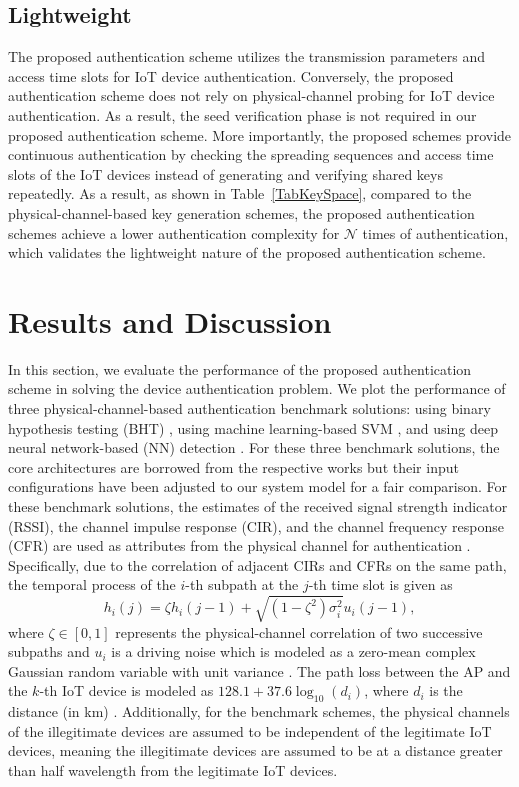 \documentclass[journal,10pt]{IEEEtran}
\begin{document}
\subsection{Lightweight}
The proposed authentication scheme utilizes the transmission parameters and access time slots for IoT device authentication. Conversely, the proposed authentication scheme does not rely on physical-channel probing for IoT device authentication. As a result, the seed verification phase is not required in our proposed authentication scheme. More importantly, the proposed schemes provide continuous authentication by checking the spreading sequences and access time slots of the IoT devices instead of generating and verifying shared keys repeatedly. As a result, as shown in Table~\ref{TabKeySpace}, compared to the physical-channel-based key generation schemes, the proposed authentication schemes achieve a lower authentication complexity for $\mathcal{N}$ times of authentication, which validates the lightweight nature of the proposed authentication scheme.  





\section{Results and Discussion}
In this section, we evaluate the performance of the proposed authentication scheme in solving the device authentication problem. We plot the performance of three physical-channel-based authentication benchmark solutions: using binary hypothesis testing (BHT) \cite{xie2021physical}, using machine learning-based SVM \cite{9354771}, and using deep neural network-based (NN) detection \cite{8935162}. For these three benchmark solutions, the core architectures are borrowed from the respective works but their input configurations have been adjusted to our system model for a fair comparison. For these benchmark solutions, the estimates of the received signal strength indicator (RSSI), the channel impulse response (CIR), and the channel frequency response (CFR) are used as attributes from the physical channel for authentication \cite{9279294}. Specifically, due to the correlation of adjacent CIRs and CFRs on the same path, the temporal process of the $i$-th subpath at the $j$-th time slot is given as \cite{9279294}
\begin{equation}
    h_{i}(j)=\zeta h_{i}(j-1)+\sqrt{(1-\zeta^2) \sigma_{i}^{2}} u_{i}(j-1),
\end{equation}
where $\zeta \in [0,1]$ represents the physical-channel correlation of two successive subpaths and $u_{i}$ is a driving noise which is modeled as a zero-mean complex Gaussian random variable with unit variance \cite{xie2021physical}. The path loss between the AP and the $k$-th IoT device is modeled as $128.1 + 37.6 \log_{10} (d_i)$, where $d_i$ is the distance (in km) \cite{ETUR2021evolved}. Additionally, for the benchmark schemes, the physical channels of the illegitimate devices are assumed to be independent of the legitimate IoT devices, meaning the illegitimate devices are assumed to be at a distance greater than half wavelength from the legitimate IoT devices. 
\end{document}
